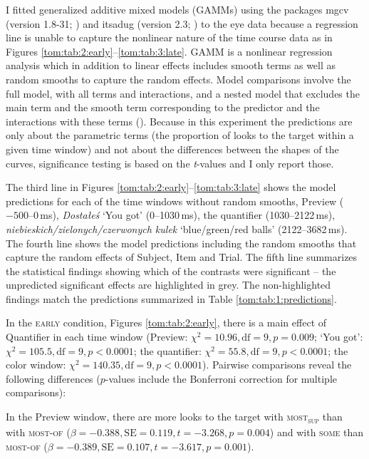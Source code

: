\documentclass[output=paper]{langscibook}
\begin{document}
I fitted generalized additive mixed models (GAMMs) using the packages mgcv (version 1.8-31; \citealt{wood2017package,wood2017generalized}) and
itsadug (version 2.3; \citealt{itsadug}) to the eye data because a regression line is unable to capture the
nonlinear nature of the time course data as in Figures \ref{tom:tab:2:early}--\ref{tom:tab:3:late}. GAMM is a nonlinear regression analysis which in addition to
linear effects includes smooth terms as well as random smooths to capture the random effects. Model comparisons involve
the full model, with all terms and interactions, and a nested model that excludes the main term and the smooth term
corresponding to the predictor and the interactions with these terms (\citealt{winter2016analyze,soskuthy2017generalised,wood2017generalized}). Because in this experiment the predictions are only about the parametric terms (the proportion of looks to the
target within a given time window) and not about the differences between the shapes of the curves, significance testing
is based on the \textit{t}{}-values and I only report those.

The third line in Figures \ref{tom:tab:2:early}--\ref{tom:tab:3:late} shows the model predictions for each of the time windows without random smooths, Preview
($-500$--0\,ms), \textit{Dostałeś} `You got' (0--1030\,ms), the quantifier (1030--2122\,ms),
\textit{niebieskich\slash zielonych\slash czerwonych kulek} `blue\slash green\slash red balls' (2122--3682\,ms). The fourth line shows the model
predictions including the random smooths that capture the random effects of Subject, Item and Trial. The fifth line
summarizes the statistical findings showing which of the contrasts were significant -- the unpredicted significant
effects are highlighted in grey. The non-highlighted findings match the predictions summarized in Table \ref{tom:tab:1:predictions}.

In the \textsc{early} condition, Figures \ref{tom:tab:2:early}, there is a main effect of Quantifier in each time window (Preview: $\chi^2=10.96, \text{df}=9,
p=0.009$; `You got': $\chi^2=105.5, \text{df}=9,\allowbreak p<0.0001$; the quantifier: $\chi^2=55.8, 
\text{df}=9,
p<0.0001$; the color window: $\chi^2=140.35, \text{df}=9, p<0.0001$). Pairwise
comparisons reveal the following differences ($p$-values include the Bonferroni correction for multiple comparisons):

In the Preview window, there are more looks to the target with \textsc{most\textsubscript{sup}} than with
\textsc{most-of} ($\beta =-0.388, \text{SE}=0.119, t=-3.268, p=0.004$) and with \textsc{some} than
\textsc{most-of} ($\beta =-0.389, \text{SE}=0.107, t=-3.617, p=0.001$).
\end{document}

